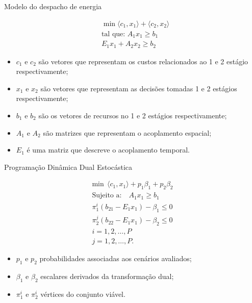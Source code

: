 \documentclass[12pt]{beamer}
\begin{document}
\begin{frame}{Modelo do despacho de energia}
	\begin{justify}	
	\begin{align}
		&\min \langle c_1,x_1\rangle + \langle c_2,x_2\rangle \nonumber \\
		&\mbox{tal que: }	A_1 x_1 \geq b_1 \nonumber \\
		&E_1 x_1 + A_2 x_2 \geq b_2 \nonumber
	\end{align}
	\begin{itemize}
	  \item $c_1$ e $c_2$ s\~ao vetores que representam os custos relacionados ao 1 e 2 est\'agio respectivamente;
	  \item $x_1$ e $x_2$ s\~ao vetores que representam as decis\~oes tomadas 1 e 2 est\'agios respectivamente;
	  \item $b_1$ e $b_2$ s\~ao os vetores de recursos no 1 e 2 est\'agios respectivamente;
	  \item $A_1$ e $A_2$ s\~ao matrizes que representam o acoplamento espacial;
	  \item $E_1$ \'e uma matriz que descreve o acoplamento temporal.
	\end{itemize}
	\end{justify}
\end{frame}

\begin{frame}{Programa\c c\~ao Din\^amica Dual Estoc\'astica}
	\begin{justify}	
		\begin{align*}
		{\text{min}} \ \ \langle c_1,x_1\rangle + p_1 {\beta}_{1} + p_2 {\beta}_{2} \\
		\textrm{Sujeito a:} \quad A_1 x_1 \geq b_1 \\
		{\pi}_{1}^{i}(b_{21} - E_1x_1) - {\beta}_{1} \leq 0 \\ 
		{\pi}_{2}^{j}(b_{22} - E_1x_1) - {\beta}_{2} \leq 0 \\ 
		i = 1, 2, \dots , P \\
		j = 1, 2, \dots , P. 
		\end{align*}
		\begin{itemize}
			\item $p_1$ e $p_2$ probabilidades associadas aos cen\'arios avaliados;
			\item $\beta_1$ e $\beta_2$ escalares derivados da transforma\c c\~ao dual;
			\item ${\pi}_{1}^{i}$ e ${\pi}_{2}^{i}$ v\'ertices do conjunto vi\'avel.
		\end{itemize}
	\end{justify}
\end{frame}
\end{document}
